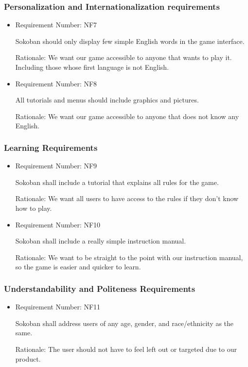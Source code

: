 \documentclass[12pt, titlepage]{article}
\begin{document}
  
\subsubsection{Personalization and Internationalization requirements}

\begin{itemize}
    \item Requirement Number: NF7
    
Sokoban should only display few simple English words in the game interface.
     
    Rationale: We want our game accessible to anyone that wants to play it. Including those whose first language is not English.
    
        \item Requirement Number: NF8
    
All tutorials and menus should include graphics and pictures.
     
    Rationale: We want our game accessible to anyone that does not know any English.
\end{itemize}

\subsubsection{Learning Requirements}
\begin{itemize}
            \item Requirement Number: NF9
    
Sokoban shall include a tutorial that explains all rules for the game.
     
    Rationale: We want all users to have access to the rules if they don't know how to play. 
    
        \item Requirement Number: NF10
    
Sokoban shall include a really simple instruction manual.
     
    Rationale: We want to be straight to the point with our instruction manual, so the game is easier and quicker to learn.
\end{itemize}


\subsubsection{Understandability and Politeness Requirements}

\begin{itemize}
    \item Requirement Number: NF11
    
Sokoban shall address users of any age, gender, and race/ethnicity as the same. 
     
    Rationale: The user should not have to feel left out or targeted due to our product.
\end{itemize}
\end{document}
